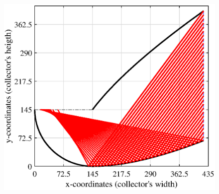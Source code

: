 \begin{figure}[ht!]
	\begin{minipage}{0.48\columnwidth}
		\includegraphics[scale=0.48]{figs/RT2D-hts0.eps}
		

\end{minipage}
\end{figure}
